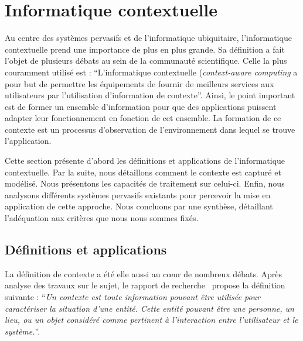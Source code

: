 \section{Informatique contextuelle}\label{sec:rw:supervision:contexte}
Au centre des systèmes pervasifs et de l'informatique ubiquitaire, l'informatique contextuelle prend une importance de plus en plus grande. Sa définition a fait l'objet de plusieurs débats au sein de la communauté scientifique. Celle la plus couramment utilisé est : \enquote{L'informatique contextuelle (\textit{context-aware computing} a pour but de permettre les équipements de fournir de meilleurs services aux utilisateurs par l'utilisation d'information de contexte}\cite{Han:contextaware}. Ainsi, le point important est de former un ensemble d'information pour que des applications puissent adapter leur fonctionnement en fonction de cet ensemble. La formation de ce contexte est un processus d'observation de l'environnement dans lequel se trouve l'application.

Cette section présente d'abord les définitions et applications de l'informatique contextuelle. Par la suite, nous détaillons comment le contexte est capturé et modélisé. Nous présentons les capacités de traitement sur celui-ci. Enfin, nous analysons différents systèmes pervasifs existants pour percevoir la mise en application de cette approche. Nous concluons par une synthèse, détaillant l'adéquation aux critères que nous nous sommes fixés.
\subsection{Définitions et applications}
La définition de contexte a été elle aussi au cœur de nombreux débats. Après analyse des travaux sur le sujet, le rapport de recherche~\cite{Dey:context} propose la définition suivante : \enquote{\it Un contexte est toute information pouvant être utilisée pour caractériser la situation d'une entité. Cette entité pouvant être une personne, un lieu, ou un objet considéré comme pertinent à l'interaction entre l'utilisateur et le système.}.

